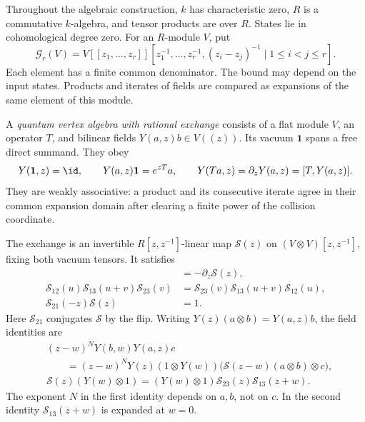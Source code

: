 Throughout the algebraic construction, $k$ has characteristic zero,
$R$ is a commutative $k$-algebra, and tensor products are over $R$.
States lie in cohomological degree zero. For an $R$-module $V$, put
\begin{equation}\label{cylev:eq:germs}
 \mathcal G_r(V)=V[[z_1,\ldots,z_r]]
 [z_1^{-1},\ldots,z_r^{-1},(z_i-z_j)^{-1}\mid 1\leq i<j\leq r].
\end{equation}
Each element has a finite common denominator. The bound may depend
on the input states. Products and iterates of fields are compared
as expansions of the same element of this module.

\begin{definition}\label{cylev:def:fields}
A \emph{quantum vertex algebra with rational exchange} consists of
a flat module $V$, an operator $T$, and bilinear fields
$Y(a,z)b\in V((z))$.
Its vacuum $\mathbf1$ spans a free direct summand.
They obey
\[
 Y(\mathbf1,z)=\id,\qquad Y(a,z)\mathbf1=e^{zT}a,\qquad
 Y(Ta,z)=\partial_zY(a,z)=[T,Y(a,z)].
\]
They are weakly associative: a product and its consecutive iterate
agree in their common expansion domain after clearing a finite power
of the collision coordinate.

The exchange is an invertible $R[z,z^{-1}]$-linear map
$\mathcal S(z)$ on $(V\otimes V)[z,z^{-1}]$, fixing both vacuum
tensors. It satisfies
\begin{align}
 [T\otimes1,\mathcal S(z)]&=-\partial_z\mathcal S(z),
       \label{cylev:eq:shift}\\
 \mathcal S_{12}(u)\mathcal S_{13}(u+v)\mathcal S_{23}(v)
 &=\mathcal S_{23}(v)\mathcal S_{13}(u+v)\mathcal S_{12}(u),
       \label{cylev:eq:yb}\\
 \mathcal S_{21}(-z)\mathcal S(z)&=1.
       \label{cylev:eq:unitarity}
\end{align}
Here $\mathcal S_{21}$ conjugates $\mathcal S$ by the flip.
Writing $Y(z)(a\otimes b)=Y(a,z)b$, the field identities are
\begin{align}
 &(z-w)^N Y(b,w)Y(a,z)c\nonumber\\
 &\qquad=(z-w)^N Y(z)(1\otimes Y(w))
       \bigl(\mathcal S(z-w)(a\otimes b)\otimes c\bigr),
       \label{cylev:eq:locality}\\
 &\mathcal S(z)(Y(w)\otimes1)
       =(Y(w)\otimes1)\mathcal S_{23}(z)\mathcal S_{13}(z+w).
       \label{cylev:eq:hexagon}
\end{align}
The exponent $N$ in the first identity depends on $a,b$, not on $c$.
In the second identity $\mathcal S_{13}(z+w)$ is expanded at $w=0$.
\end{definition}

